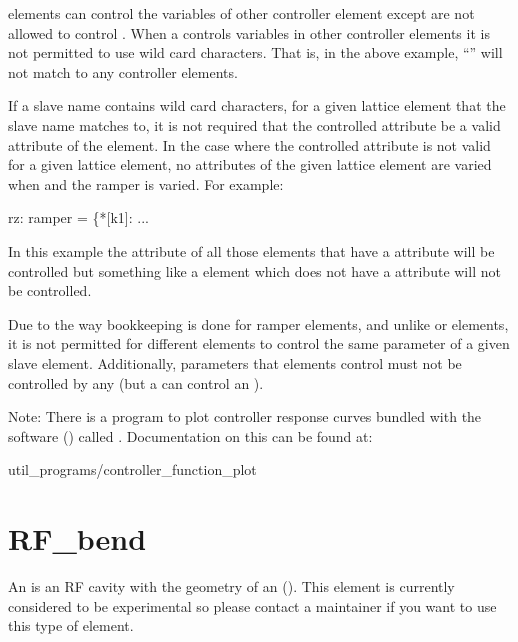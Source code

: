 { elements can control the variables of other controller element except  are
not allowed to control . When a  controls variables in other controller
elements it is not permitted to use wild card characters. That is, in the above example, ``\vn{*}''
will not match to any controller elements.

If a slave name contains wild card characters, for a given lattice element that the slave name
matches to, it is not required that the controlled attribute be a valid attribute of the element. In
the case where the controlled attribute is not valid for a given lattice element, no attributes of
the given lattice element are varied when and the ramper is varied. For example:
\begin{example}
  rz: ramper = \{*[k1]: ...
\end{example}
In this example the  attribute of all those elements that have a  attribute will be
controlled but something like a  element which does not have a  attribute will
not be controlled.

Due to the way bookkeeping is done for ramper elements, and unlike  or 
elements, it is not permitted for different  elements to control the same parameter of a
given slave element. Additionally, parameters that  elements control must not be
controlled by any  (but a  can control an ).

Note: There is a program to plot controller response curves bundled with the \bmad software
() called . Documentation on this can
be found at:
\begin{example}
  util_programs/controller_function_plot
\end{example}

\newpage

\section{RF_bend}
\label{s:rf.bend}

An  is an RF cavity with the geometry of an  (). This element is
currently considered to be experimental so please contact a \bmad maintainer if you want to use this
type of element.

}
